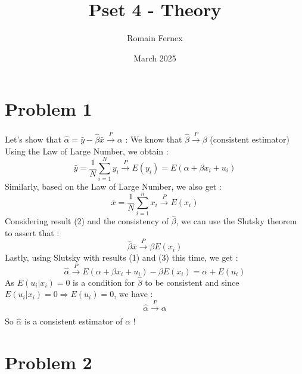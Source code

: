 \documentclass{article}
\title{Pset 4 - Theory}
\author{Romain Fernex}
\date{March 2025}
\begin{document}
\maketitle

\section{Problem 1}


Let's show that $\hat{\alpha}=\bar{y}-\hat{\beta}\bar{x}\xrightarrow{P}\alpha$ : We know that $\hat{\beta}\xrightarrow{P}\beta$ (consistent estimator)
Using the Law of Large Number, we obtain : 
\begin{equation}
    \bar{y} = \frac{1}{N}\sum_{i=1}^N y_i \xrightarrow{P}E(y_i) = E(\alpha+\beta x_i +u_i) 
\end{equation}
Similarly, based on the Law of Large Number, we also get : 
\begin{equation}
    \bar{x} = \frac{1}{N}\sum_{i=1}^nx_i \xrightarrow[]{P}E(x_i)
\end{equation}
Considering result (2) and the consistency of $\hat{\beta}$, we can use the Slutsky theorem to assert that : 
\begin{equation}
    \hat{\beta}\bar{x} \xrightarrow{P} \beta E(x_i)
\end{equation}
Lastly, using Slutsky with results (1) and (3) this time, we get : 
\begin{equation}
    \hat{\alpha} \xrightarrow{P} E(\alpha + \beta x_i + u_i) - \beta E(x_i) = \alpha + E(u_i) 
\end{equation}
As $E(u_i|x_i)=0$ is a condition for $\hat{\beta}$ to be consistent and since $E(u_i|x_i)=0 \Longrightarrow{} E(u_i)=0$, we have : 
\begin{equation}
    \hat{\alpha} \xrightarrow[]{P} \alpha
\end{equation}
So $\hat{\alpha}$ is a consistent estimator of $\alpha$ !

\section{Problem 2}
\end{document}
